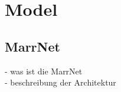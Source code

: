 \chapter{Model}


\section{MarrNet}
\label{sec:model:marrnet}
- was ist die MarrNet \\
- beschreibung der Architektur 
